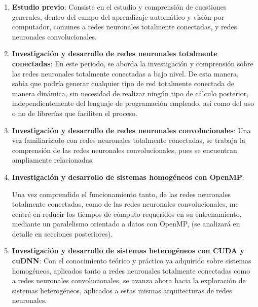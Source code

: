 \begin{enumerate}[label=\textbullet]
	\item \textbf{Estudio previo}: Consiste en el estudio y comprensión de cuestiones generales, dentro del campo del aprendizaje automático y visión por computador, comunes a redes neuronales totalmente conectadas, y redes neuronales convolucionales.
	
	\item \textbf{Investigación y desarrollo de redes neuronales totalmente conectadas}: En este periodo, se aborda la investigación y comprensión sobre las redes neuronales totalmente conectadas a bajo nivel. De esta manera, sabía que podría generar cualquier tipo de red totalmente conectada de manera dinámica, sin necesidad de realizar ningún tipo de cálculo posterior, independientemente del lenguaje de programación empleado, así como del uso o no de librerías que faciliten el proceso. 
	
	\item \textbf{Investigación y desarrollo de redes neuronales convolucionales}:
	Una vez familiarizado con redes neuronales totalmente conectadas, se trabaja la comprensión de las redes neuronales convolucionales, pues se encuentran ampliamente relacionadas.
	\item \textbf{Investigación y desarrollo de sistemas homogéneos con OpenMP}:
	
	Una vez comprendido el funcionamiento tanto, de las redes neuronales totalmente conectadas, como de las redes neuronales convolucionales, me centré en reducir los tiempos de cómputo requeridos en su entrenamiento, mediante un paralelismo orientado a datos con OpenMP, (se analizará en detalle en secciones posteriores).
	
	\item \textbf{Investigación y desarrollo de sistemas heterogéneos con CUDA y cuDNN}:
	Con el conocimiento teórico y práctico ya adquirido sobre sistemas homogéneos, aplicados tanto a redes neuronales totalmente conectadas como a redes neuronales convolucionales, se avanza ahora hacia la exploración de sistemas heterogéneos, aplicados a estas mismas arquitecturas de redes neuronales.
\end{enumerate}


